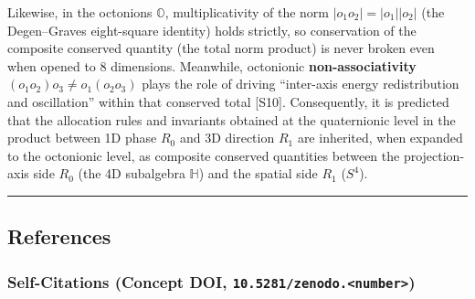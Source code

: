 \documentclass[
  a4paper,
]{article}
\begin{document}
Likewise, in the octonions \(\mathbb{O}\), multiplicativity of the norm
\(|o_1 o_2| = |o_1||o_2|\) (the Degen--Graves eight-square identity)
holds strictly, so conservation of the composite conserved quantity (the
total norm product) is never broken even when opened to 8 dimensions.
Meanwhile, octonionic \textbf{non-associativity}
\((o_1 o_2) o_3 \neq o_1 (o_2 o_3)\) plays the role of driving
``inter-axis energy redistribution and oscillation'' within that
conserved total {[}S10{]}. Consequently, it is predicted that the
allocation rules and invariants obtained at the quaternionic level in
the product between 1D phase \(R_0\) and 3D direction \(R_1\) are
inherited, when expanded to the octonionic level, as composite conserved
quantities between the projection-axis side \(R_0\) (the 4D subalgebra
\(\mathbb{H}\)) and the spatial side \(R_1\) (\(S^4\)).

\begin{center}\rule{0.5\linewidth}{0.5pt}\end{center}

\subsection{References}\label{references}

\subsubsection{\texorpdfstring{Self-Citations (Concept DOI,
\texttt{10.5281/zenodo.\textless{}number\textgreater{}})}{Self-Citations (Concept DOI, 10.5281/zenodo.\textless number\textgreater)}}\label{self-citations-concept-doi-10.5281zenodo.number}
\end{document}

